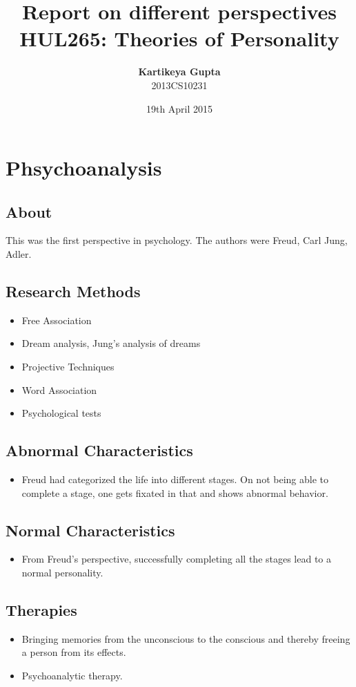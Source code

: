 \documentclass{article}
\title{\textbf{Report on different perspectives}
	  \\ {\large \textbf{HUL265: Theories of Personality}}}
\author
{
	\textbf{Kartikeya Gupta}\\ 
	2013CS10231\\
}
\date{19th April 2015}
\begin{document}
	\maketitle
	\tableofcontents
	\newpage
	\section{Phsychoanalysis}
		\subsection{About}
			This was the first perspective in psychology. The authors were Freud, Carl Jung, Adler.
		\subsection{Research Methods}
			\begin{itemize}
				\item Free Association
				\item Dream analysis, Jung's analysis of dreams
				\item Projective Techniques
				\item Word Association
				\item Psychological tests
			\end{itemize}
		\subsection{Abnormal Characteristics}
			\begin{itemize}
				\item Freud had categorized the life into different stages. On not being able to complete a stage, one gets fixated in that and shows abnormal behavior.
			\end{itemize}
		\subsection{Normal Characteristics}
			\begin{itemize}
				\item From Freud's perspective, successfully completing all the stages lead to a normal personality.
			\end{itemize}
		\subsection{Therapies}
			\begin{itemize}
				\item Bringing memories from the unconscious to the conscious and thereby freeing a person from its effects.
				\item Psychoanalytic therapy.
			\end{itemize}
\end{document}
